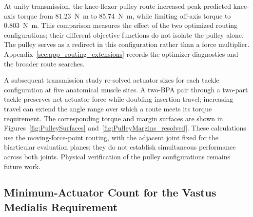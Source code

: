 At unity transmission, the knee-flexor pulley route increased peak predicted knee-axis torque from \qty{81.23}{\newton\meter} to \qty{85.74}{\newton\meter}, while limiting off-axis torque to \qty{0.803}{\newton\meter}. This comparison measures the effect of the two optimized routing configurations; their different objective functions do not isolate the pulley alone. The pulley serves as a redirect in this configuration rather than a force multiplier. Appendix~\ref{sec:app_routing_extensions} records the optimizer diagnostics and the broader route searches.

A subsequent transmission study re-solved actuator sizes for each tackle configuration at five anatomical muscle sites. A two-BPA pair through a two-part tackle preserves net actuator force while doubling insertion travel; increasing travel can extend the angle range over which a route meets its torque requirement. The corresponding torque and margin surfaces are shown in Figures~\ref{fig:PulleySurfaces} and~\ref{fig:PulleyMargins_resolved}. These calculations use the moving-force-point routing, with the adjacent joint fixed for the biarticular evaluation planes; they do not establish simultaneous performance across both joints. Physical verification of the pulley configurations remains future work.

\subsection{Minimum-Actuator Count for the Vastus Medialis Requirement}\label{sec:min_bpa}

